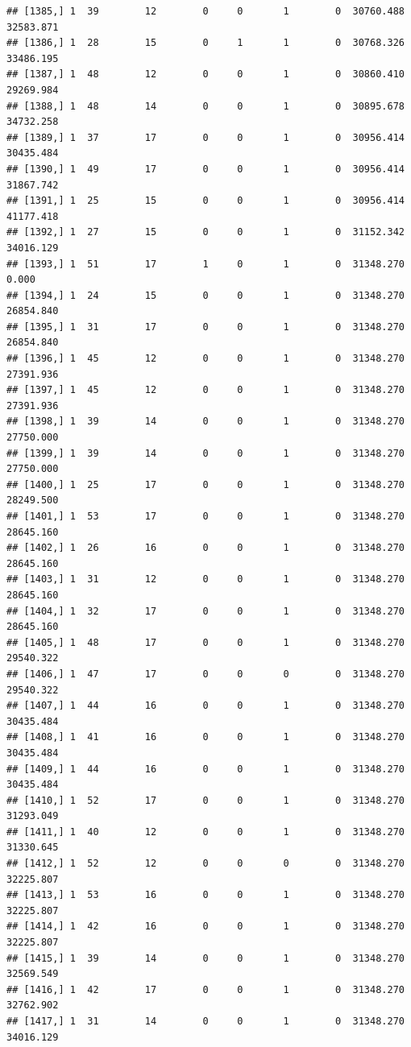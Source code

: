 \documentclass[
]{article}
\begin{document}
\begin{verbatim}
## [1385,] 1  39        12        0     0       1        0  30760.488  32583.871
## [1386,] 1  28        15        0     1       1        0  30768.326  33486.195
## [1387,] 1  48        12        0     0       1        0  30860.410  29269.984
## [1388,] 1  48        14        0     0       1        0  30895.678  34732.258
## [1389,] 1  37        17        0     0       1        0  30956.414  30435.484
## [1390,] 1  49        17        0     0       1        0  30956.414  31867.742
## [1391,] 1  25        15        0     0       1        0  30956.414  41177.418
## [1392,] 1  27        15        0     0       1        0  31152.342  34016.129
## [1393,] 1  51        17        1     0       1        0  31348.270      0.000
## [1394,] 1  24        15        0     0       1        0  31348.270  26854.840
## [1395,] 1  31        17        0     0       1        0  31348.270  26854.840
## [1396,] 1  45        12        0     0       1        0  31348.270  27391.936
## [1397,] 1  45        12        0     0       1        0  31348.270  27391.936
## [1398,] 1  39        14        0     0       1        0  31348.270  27750.000
## [1399,] 1  39        14        0     0       1        0  31348.270  27750.000
## [1400,] 1  25        17        0     0       1        0  31348.270  28249.500
## [1401,] 1  53        17        0     0       1        0  31348.270  28645.160
## [1402,] 1  26        16        0     0       1        0  31348.270  28645.160
## [1403,] 1  31        12        0     0       1        0  31348.270  28645.160
## [1404,] 1  32        17        0     0       1        0  31348.270  28645.160
## [1405,] 1  48        17        0     0       1        0  31348.270  29540.322
## [1406,] 1  47        17        0     0       0        0  31348.270  29540.322
## [1407,] 1  44        16        0     0       1        0  31348.270  30435.484
## [1408,] 1  41        16        0     0       1        0  31348.270  30435.484
## [1409,] 1  44        16        0     0       1        0  31348.270  30435.484
## [1410,] 1  52        17        0     0       1        0  31348.270  31293.049
## [1411,] 1  40        12        0     0       1        0  31348.270  31330.645
## [1412,] 1  52        12        0     0       0        0  31348.270  32225.807
## [1413,] 1  53        16        0     0       1        0  31348.270  32225.807
## [1414,] 1  42        16        0     0       1        0  31348.270  32225.807
## [1415,] 1  39        14        0     0       1        0  31348.270  32569.549
## [1416,] 1  42        17        0     0       1        0  31348.270  32762.902
## [1417,] 1  31        14        0     0       1        0  31348.270  34016.129

\end{verbatim}
\end{document}
